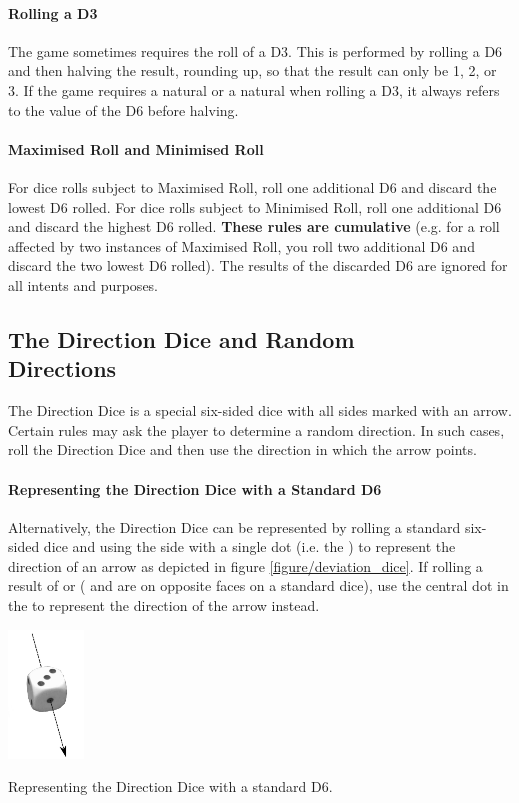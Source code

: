 \paragraph{Rolling a D3}

The game sometimes requires the roll of a D3. This is performed by rolling a D6 and then halving the result, rounding up, so that the result can only be 1, 2, or 3. If the game requires a natural  or a natural  when rolling a D3, it always refers to the value of the D6 before halving.

\paragraph{Maximised Roll and Minimised Roll}
\label{maximised_roll}

For dice rolls subject to Maximised Roll, roll one additional D6 and discard the lowest D6 rolled. For dice rolls subject to Minimised Roll, roll one additional D6 and discard the highest D6 rolled. \textbf{These rules are cumulative} (e.g. for a roll affected by two instances of Maximised Roll, you roll two additional D6 and discard the two lowest D6 rolled). The results of the discarded D6 are ignored for all intents and purposes.

\subsection[The Direction Dice and Random Directions]{The Direction Dice and Random\\ Directions}
\label{the_direction_dice_and_random_directions}

The Direction Dice is a special six-sided dice with all sides marked with an arrow. Certain rules may ask the player to determine a random direction. In such cases, roll the Direction Dice and then use the direction in which the arrow points.

\paragraph{Representing the Direction Dice with a Standard D6}

Alternatively, the Direction Dice can be represented by rolling a standard six-sided dice and using the side with a single dot (i.e. the ) to represent the direction of an arrow as depicted in figure \ref{figure/deviation_dice}. If rolling a result of  or  ( and  are on opposite faces on a standard dice), use the central dot in the  to represent the direction of the arrow instead.

\begin{Figure}
	\Fanchor
	\centering
	\includegraphics[width=2cm]{../pics/deviation_dice.png}
	\caption{Representing the Direction Dice with a standard D6.}
	\label{figure/deviation_dice}
\end{Figure}

\RBemc
